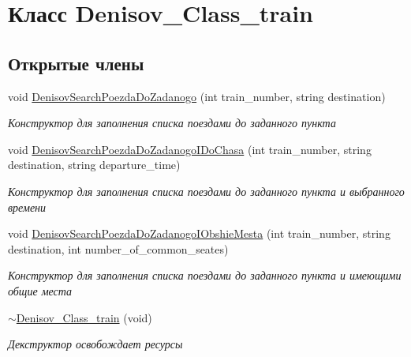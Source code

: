 \hypertarget{class_denisov___class__train}{\section{Класс Denisov\+\_\+\+Class\+\_\+train}
\label{class_denisov___class__train}
}
\subsection*{Открытые члены}
\begin{DoxyCompactItemize}
\item 
void \hyperlink{class_denisov___class__train_ab0b7f29a9dc3b1c6d7fbb5d3df53c2ae}{Denisov\+Search\+Poezda\+Do\+Zadanogo} (int train\+\_\+number, string destination)
\begin{DoxyCompactList}\small\item\em Конструктор для заполнения списка поездами до заданного пункта \end{DoxyCompactList}\item 
void \hyperlink{class_denisov___class__train_a2771731a6c3e1bc4ced8b015b4749268}{Denisov\+Search\+Poezda\+Do\+Zadanogo\+I\+Do\+Chasa} (int train\+\_\+number, string destination, string departure\+\_\+time)
\begin{DoxyCompactList}\small\item\em Конструктор для заполнения списка поездами до заданного пункта и выбранного времени \end{DoxyCompactList}\item 
void \hyperlink{class_denisov___class__train_a3e0ed25d93015505a6308523d677740a}{Denisov\+Search\+Poezda\+Do\+Zadanogo\+I\+Obshie\+Mesta} (int train\+\_\+number, string destination, int number\+\_\+of\+\_\+common\+\_\+seates)
\begin{DoxyCompactList}\small\item\em Конструктор для заполнения списка поездами до заданного пункта и имеющими общие места \end{DoxyCompactList}\item 
\hypertarget{class_denisov___class__train_acd3fa28da432c592c824f745098f76d9}{\hyperlink{class_denisov___class__train_acd3fa28da432c592c824f745098f76d9}{$\sim$\+Denisov\+\_\+\+Class\+\_\+train} (void)}\label{class_denisov___class__train_acd3fa28da432c592c824f745098f76d9}

\begin{DoxyCompactList}\small\item\em Декструктор освобождает ресурсы \end{DoxyCompactList}\end{DoxyCompactItemize}
